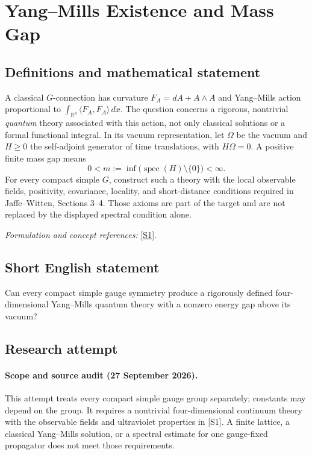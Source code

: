 \documentclass[11pt]{article}
\begin{document}
\section*{\texorpdfstring{Yang–Mills Existence and Mass Gap}{Yang–Mills Existence and Mass Gap}}\label{3}
\subsection{Definitions and mathematical statement}
A classical $G$-connection has curvature $F_A=dA+A\wedge A$ and Yang--Mills action proportional to $\int_{{\mathbb{R}}^4}\langle F_A,F_A\rangle\,dx$. The question concerns a rigorous, nontrivial \emph{quantum} theory associated with this action, not only classical solutions or a formal functional integral. In its vacuum representation, let $\Omega$ be the vacuum and $H\ge0$ the self-adjoint generator of time translations, with $H\Omega=0$. A positive finite mass gap means
\[
 0<m:=\inf\bigl(\operatorname{spec}(H)\setminus\{0\}\bigr)<\infty.
\]
For every compact simple $G$, construct such a theory with the local observable fields, positivity, covariance, locality, and short-distance conditions required in Jaffe--Witten, Sections 3--4. Those axioms are part of the target and are not replaced by the displayed spectral condition alone.
\par\smallskip\textit{Formulation and concept references:} \href{https://www.claymath.org/wp-content/uploads/2022/06/yangmills.pdf}{[S1]}.

\subsection{Short English statement}
Can every compact simple gauge symmetry produce a rigorously defined four-dimensional Yang--Mills quantum theory with a nonzero energy gap above its vacuum?
\subsection{Research attempt}

\paragraph{Scope and source audit (27 September 2026).}
This attempt treats every compact simple gauge group separately; constants may
 depend on the group. It requires a nontrivial four-dimensional continuum
 theory with the observable fields and ultraviolet properties in [S1]. A
 finite lattice, a classical Yang--Mills solution, or a spectral estimate for
 one gauge-fixed propagator does not meet those requirements.
\end{document}
